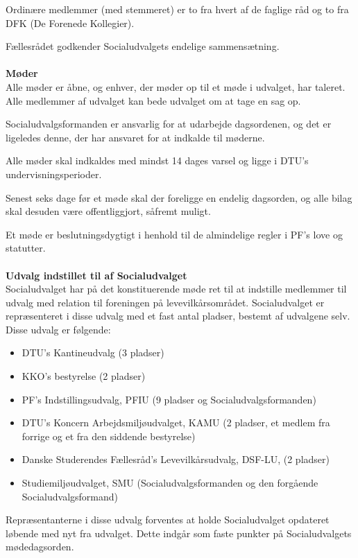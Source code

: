 Ordinære medlemmer (med stemmeret) er to fra hvert af de faglige råd og to fra DFK (De Forenede Kollegier).

Fællesrådet godkender Socialudvalgets endelige sammensætning.\\
\\
\textbf{Møder}\\
Alle møder er åbne, og enhver, der møder op til et møde i udvalget, har taleret. Alle
medlemmer af udvalget kan bede udvalget om at tage en sag op.

Socialudvalgsformanden er ansvarlig for at udarbejde dagsordenen, og det er ligeledes denne, der har ansvaret for at
indkalde til møderne.

Alle møder skal indkaldes med mindst 14 dages varsel og ligge i DTU's undervisningsperioder.

Senest seks dage før et møde skal der foreligge en endelig dagsorden, og alle bilag skal desuden være offentliggjort, såfremt muligt.

Et møde er beslutningsdygtigt i henhold til de almindelige regler i PF’s love og statutter.\\
\\
\textbf{Udvalg indstillet til af Socialudvalget}\\
Socialudvalget har på det konstituerende møde ret til at indstille medlemmer til udvalg med relation til foreningen på
levevilkårsområdet. Socialudvalget er repræsenteret i disse udvalg med et fast antal pladser, bestemt af udvalgene selv.
Disse udvalg er følgende:
\begin{itemize}
\item DTU’s Kantineudvalg (3 pladser)
\item KKO’s bestyrelse (2 pladser)
\item PF’s Indstillingsudvalg, PFIU (9 pladser og Socialudvalgsformanden)
\item DTU’s Koncern Arbejdsmiljøudvalget, KAMU (2 pladser, et medlem fra forrige og  et fra den siddende bestyrelse)
\item Danske Studerendes Fællesråd’s Levevilkårsudvalg, DSF-LU, (2 pladser)
\item Studiemiljøudvalget, SMU (Socialudvalgsformanden og den forgående Socialudvalgsformand)
\end{itemize}

Repræsentanterne i disse udvalg forventes at holde Socialudvalget opdateret løbende med nyt fra udvalget. Dette indgår
som faste punkter på Socialudvalgets mødedagsorden.